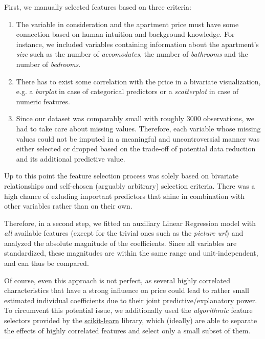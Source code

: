 \documentclass[12pt, letterpaper]{article}
\begin{document}
First, we manually selected features based on three criteria:
\begin{enumerate}
    \item The variable in consideration and the apartment price must have some connection based on human intuition and background knowledge. For instance, we included variables containing information about the apartment's \emph{size} such as the number of \emph{accomodates}, the number of \emph{bathrooms} and the number of \emph{bedrooms}.
    \item There has to exist some correlation with the price in a bivariate visualization, e.g. a \emph{barplot} in case of categorical predictors or a \emph{scatterplot} in case of numeric features.
    \item Since our dataset was comparably small with roughly $3000$ observations, we had to take care about missing values.
          Therefore, each variable whose missing values could not be imputed in a meaningful and uncontroversial manner was either selected or dropped based on the trade-off of potential data reduction and its additional predictive value.
\end{enumerate}

Up to this point the feature selection process was solely based on bivariate relationships and self-chosen (arguably arbitrary) selection criteria.
There was a high chance of exluding important predictors that shine in combination with other variables rather than on their own.

Therefore, in a second step, we fitted an auxiliary Linear Regression model with \emph{all} available features (except for the trivial ones such as the \emph{picture url}) and analyzed the absolute magnitude of the coefficients.
Since all variables are standardized, these magnitudes are within the same range and unit-independent, and can thus be compared.

Of course, even this approach is not perfect, as several highly correlated characteristics that have a strong influence on price could lead to rather small estimated individual coefficients due to their joint predictive/explanatory power.
To circumvent this potential issue, we additionally used the \emph{algorithmic} feature selectors provided by the \href{https://scikit-learn.org/stable/index.html}{scikit-learn} library, which (ideally) are able to separate the effects of highly correlated features and select only a small subset of them.
\end{document}

